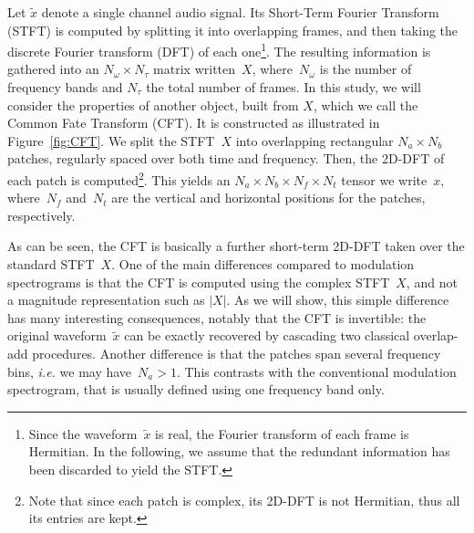 Let $\tilde{x}$ denote a single channel audio signal.
Its Short-Term Fourier Transform (STFT) is computed by splitting it
into overlapping frames, and then taking the discrete Fourier transform (DFT)
of each one\footnote{Since the waveform~$\tilde{x}$ is real, the Fourier transform of
each frame is Hermitian. In the following, we assume that the redundant
information has been discarded to yield the STFT.}. The resulting information is gathered into an $N_{\omega}\times N_{\tau}$
matrix written~$X$, where~$N_{\omega}$ is the number of frequency
bands and $N_{\tau}$ the total number of frames.
%
In this study, we will consider the properties of another object,
built from $X$, which we call the Common Fate Transform (CFT). It
is constructed as illustrated in Figure~\ref{fig:CFT}.
We split the STFT~$X$ into overlapping rectangular $N_{a}\times N_{b}$
patches, regularly spaced over both time and frequency. Then, the
2D-DFT of each patch is computed\footnote{Note that since each patch is complex, its 2D-DFT is not Hermitian,
thus all its entries are kept.}. This yields an $N_{a}\times N_{b}\times N_{f}\times N_{t}$ tensor we write~$x$,
where~$N_{f}$ and~$N_{t}$ are the vertical and horizontal
positions for the patches, respectively.

As can be seen, the CFT is basically a further short-term 2D-DFT taken over
the standard STFT~$X$. One of the main differences compared to modulation spectrograms
is that the CFT is computed using the complex STFT~$X$, and not a magnitude representation such as $\left|X\right|$. As we will
show, this simple difference has many interesting consequences, notably
that the CFT is invertible: the original waveform~$\tilde{x}$ can
be exactly recovered by cascading two classical overlap-add procedures. Another difference
is that the patches span several frequency bins, \emph{i.e.} we may have~$N_{a}>1$.
This contrasts with the conventional modulation spectrogram, that
is usually defined using one frequency band only.

